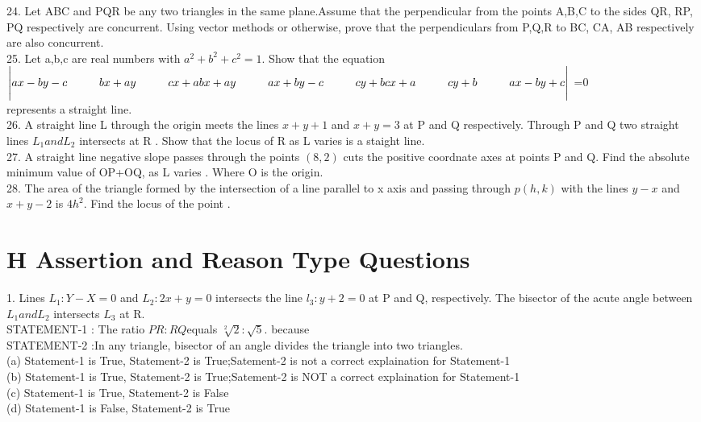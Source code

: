 \documentclass[12pt]{article}
\begin{document}
24. Let ABC and PQR be any two triangles in the same plane.Assume that the perpendicular from the points A,B,C to the sides QR, RP, PQ respectively are concurrent. Using vector methods or otherwise, prove that the perpendiculars from P,Q,R to BC, CA, AB  respectively are also concurrent.\\
25. Let a,b,c are real numbers with $a^2+b^2+c^2=1$. Show that the equation\\
$\Bigg |ax-by-c\hspace{1cm}bx+ay\hspace{1cm} cx+a\\
bx+ay  \hspace{1cm}ax+by-c  \hspace{1cm}cy+b\\
cx+a   \hspace{1cm} cy+b  \hspace{1cm}  ax-by+c\Bigg |$ =0\\
represents a straight line.\\
26. A straight line L through the origin meets the lines $x+y+1$ and $x+y=3$ at P and Q
respectively. Through  P and Q two straight lines $L_1 and L_2$ intersects at R . Show that the locus of R as L varies is a staight line.\\
27. A straight line negative slope passes through the points $(8,2)$ cuts the positive coordnate axes at points P and Q. Find the absolute minimum value of OP+OQ, as L varies . Where O is the origin.\\
28. The area of the triangle formed by the intersection of a line parallel to x axis and passing through $p(h,k)$ with the lines $y-x$ and $x+y-2$ is $4h^2$. Find the locus of the point .\\

\section*{H\hspace{1cm} Assertion and Reason Type Questions}


1. Lines $L_1: Y-X=0$ and $L_2 :2x+y=0$ intersects the line $l_3:y+2=0$ at P and Q, respectively. The bisector of the acute angle between $L_1 and L_2$ intersects $L_3$ at R.\\
STATEMENT-1 : The ratio $PR:RQ$equals $\sqrt[2]{2}:\sqrt{5}$. because \\
STATEMENT-2 :In any triangle, bisector of an angle divides the triangle into two triangles.\\
(a) Statement-1 is True, Statement-2 is True;Satement-2 is not a correct explaination for Statement-1\\
(b) Statement-1 is True, Statement-2 is True;Satement-2 is NOT a correct explaination for Statement-1\\
(c) Statement-1 is True, Statement-2 is False\\
(d) Statement-1 is False, Statement-2 is True\\
\end{document}
